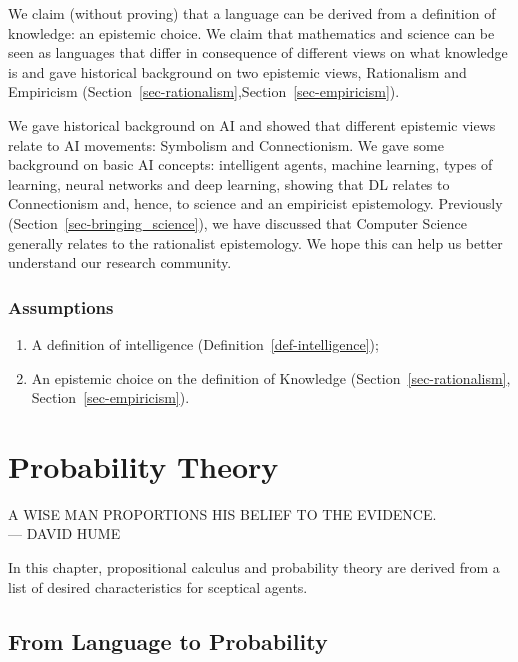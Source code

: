\documentclass[
  letterpaper,
  12pt,
  british]{tufte-book}
\renewcommand{\textls}[2][5]{%
  \begingroup\addfontfeatures{LetterSpace=#1}#2\endgroup
}
\renewcommand{\allcaps}[1]{\textls[15]{\MakeTextUppercase{#1}}}
\newcommand{\epigraph}[2]{%
  \begin{fullwidth}
  \begin{flushright}
  \sffamily\fontsize{8}{10}\selectfont
  \sffamily\footnotesize
  \begin{doublespace}
  \vspace{-8cm}\noindent\allcaps{#1}\\%
  \noindent\allcaps{#2}\\%
  \end{doublespace}
  \vspace{5.1cm}
  \end{flushright}
  \end{fullwidth}
  \normalfont
}
\renewenvironment{quote}{
  \list{}{\leftmargin=3.5cm\topsep=0pt}
  \item\relax\small\itshape
}
{\endlist}
\theoremstyle{plain}
\theoremstyle{definition}
\theoremstyle{plain}
\theoremstyle{remark}
\begin{document}
We claim (without proving) that a language can be derived from a
definition of knowledge: an epistemic choice. We claim that mathematics
and science can be seen as languages that differ in consequence of
different views on what knowledge is and gave historical background on
two epistemic views, Rationalism and Empiricism
(Section~\ref{sec-rationalism},Section~\ref{sec-empiricism}).

We gave historical background on {AI} and showed that different
epistemic views relate to {AI} movements: Symbolism and Connectionism.
We gave some background on basic {AI} concepts: intelligent agents,
machine learning, types of learning, neural networks and deep learning,
showing that {DL} relates to Connectionism and, hence, to science and an
empiricist epistemology. Previously
(Section~\ref{sec-bringing_science}), we have discussed that Computer
Science generally relates to the rationalist epistemology. We hope this
can help us better understand our research community.

\hypertarget{assumptions}{%
\subsection{Assumptions}\label{assumptions}}

\begin{enumerate}
\def\labelenumi{\arabic{enumi}.}
\item
  A definition of intelligence (Definition~\ref{def-intelligence});
\item
  An epistemic choice on the definition of Knowledge
  (Section~\ref{sec-rationalism}, Section~\ref{sec-empiricism}).
\end{enumerate}

\begin{quote}
\end{quote}

\hypertarget{probability-theory}{%
\chapter{Probability Theory}\label{probability-theory}}

\epigraph{A wise man proportions his belief to the evidence.}{--- David Hume}

In this chapter, propositional calculus and probability theory are
derived from a list of desired characteristics for sceptical agents.

\hypertarget{sec-language_probability}{%
\section{From Language to Probability}\label{sec-language_probability}}
\end{document}
